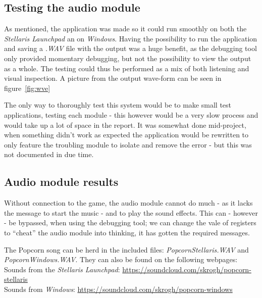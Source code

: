 \subsection{Testing the audio module}
As mentioned, the application was made so it could run smoothly on both the
\emph{Stellaris Launchpad} an on \emph{Windows}. Having the possibility to run
the application and saving a \emph{.WAV} file with the output was a huge
benefit, as the debugging tool only provided momentary debugging, but not the
possibility to view the output as a whole.
The testing could thus be performed as a mix of both listening and visual
inspection. A picture from the output wave-form can be seen in
figure~\ref{fig:wve}


The only way to thoroughly test this system would be to make small test
applications, testing each module - this however would be a very slow process
and would take up a lot of space in the report. It was somewhat done
mid-project, when something didn't work as expected the application would be
rewritten to only feature the troubling module to isolate and remove the error
- but this was not documented in due time.

\subsection{Audio module results}
Without connection to the game, the audio module cannot do much - as it lacks
the message to start the music - and to play the sound effects.
This can - however - be bypassed, when using the debugging tool; we can change
the vale of registers to ``cheat'' the audio module into thinking, it has gotten
the required messages.

The Popcorn song can be herd in the included files: \emph{PopcornStellaris.WAV}
and \emph{PopcornWindows.WAV}.
They can also be found on the following webpages:\\
Sounds from the \emph{Stellaris Launchpad}:
\url{https://soundcloud.com/skrogh/popcorn-stellaris}\\
Sounds from \emph{Windows}: \url{https://soundcloud.com/skrogh/popcorn-windows}


